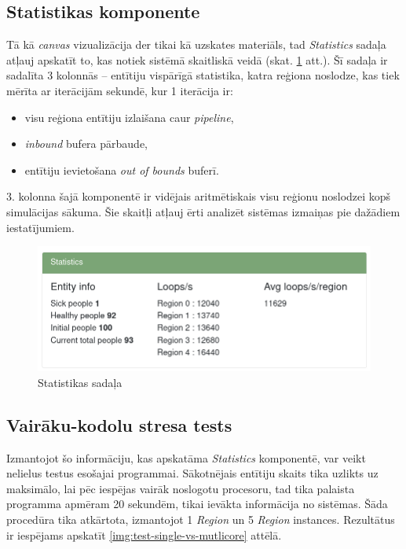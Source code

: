 \subsection{Statistikas komponente}

Tā kā \emph{canvas} vizualizācija der tikai kā uzskates materiāls, tad \emph{Statistics}
sadaļa atļauj apskatīt to, kas notiek sistēmā skaitliskā veidā (skat. \ref{img:statistics} att.).
Šī sadaļa ir sadalīta 3 kolonnās -- entītiju vispārīgā statistika, katra reģiona
noslodze, kas tiek mērīta ar iterācijām sekundē, kur 1 iterācija ir:

\begin{itemize}
    \item visu reģiona entītiju izlaišana caur \emph{pipeline},
    \item \emph{inbound} bufera pārbaude,
    \item entītiju ievietošana \emph{out of bounds} buferī.
\end{itemize}

3. kolonna šajā komponentē ir vidējais aritmētiskais visu reģionu
noslodzei kopš simulācijas sākuma. Šie skaitļi atļauj ērti analizēt sistēmas
izmaiņas pie dažādiem iestatījumiem.

\begin{figure}[H]
	\centering
	\includegraphics[scale=0.5]{images/statistics.png}
	\caption{Statistikas sadaļa}
	\label{img:statistics}
\end{figure}

\subsection{Vairāku-kodolu stresa tests}

Izmantojot šo informāciju, kas apskatāma \emph{Statistics} komponentē, var veikt
nelielus testus esošajai programmai. Sākotnējais entītiju skaits tika uzlikts uz
maksimālo, lai pēc iespējas vairāk noslogotu procesoru, tad tika palaista programma
apmēram 20 sekundēm, tikai ievākta informācija no sistēmas. Šāda procedūra tika
atkārtota, izmantojot 1 \emph{Region} un 5 \emph{Region} instances. Rezultātus
ir iespējams apskatīt \ref{img:test-single-vs-mutlicore} attēlā.

